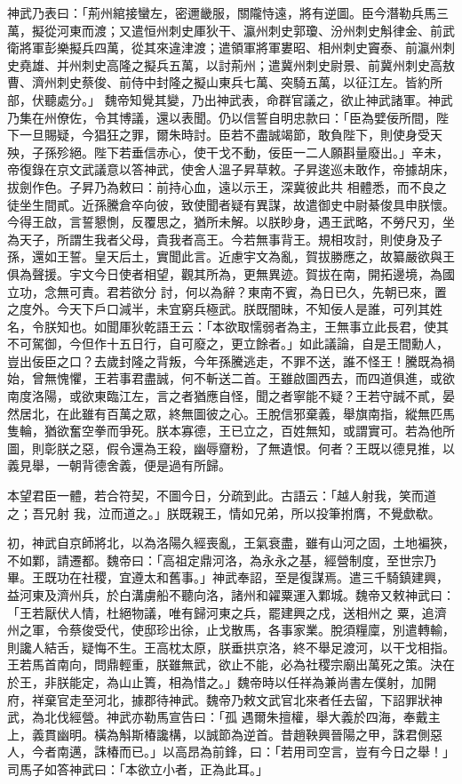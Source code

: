 \begin{pinyinscope}
 神武乃表曰：「荊州綰接蠻左，密邇畿服，關隴恃遠，將有逆圖。臣今潛勒兵馬三萬，擬從河東而渡；又遣恒州刺史厙狄干、瀛州刺史郭瓊、汾州刺史斛律金、前武衛將軍彭樂擬兵四萬，從其來違津渡；遣領軍將軍婁昭、相州刺史竇泰、前瀛州刺史堯雄、并州刺史高隆之擬兵五萬，以討荊州；遣冀州刺史尉景、前冀州刺史高敖曹、濟州刺史蔡俊、前侍中封隆之擬山東兵七萬、突騎五萬，以征江左。皆約所部，伏聽處分。」
 魏帝知覺其變，乃出神武表，命群官議之，欲止神武諸軍。神武乃集在州僚佐，令其博議，還以表聞。仍以信誓自明忠款曰：「臣為嬖佞所間，陛下一旦賜疑，今猖狂之罪，爾朱時討。臣若不盡誠竭節，敢負陛下，則使身受天殃，子孫殄絕。陛下若垂信赤心，使干戈不動，佞臣一二人願斟量廢出。」辛未，帝復錄在京文武議意以答神武，使舍人溫子昇草敕。子昇逡巡未敢作，帝據胡床，拔劍作色。子昇乃為敕曰：前持心血，遠以示王，深冀彼此共
 相體悉，而不良之徒坐生間貳。近孫騰倉卒向彼，致使聞者疑有異謀，故遣御史中尉綦俊具申朕懷。今得王啟，言誓懇惻，反覆思之，猶所未解。以朕眇身，遇王武略，不勞尺刃，坐為天子，所謂生我者父母，貴我者高王。今若無事背王。規相攻討，則使身及子孫，還如王誓。皇天后土，實聞此言。近慮宇文為亂，賀拔勝應之，故纂嚴欲與王俱為聲援。宇文今日使者相望，觀其所為，更無異迹。賀拔在南，開拓邊境，為國立功，念無可責。君若欲分
 討，何以為辭？東南不賓，為日已久，先朝已來，置之度外。今天下戶口減半，未宜窮兵極武。朕既闇昧，不知佞人是誰，可列其姓名，令朕知也。如聞厙狄乾語王云：「本欲取懦弱者為主，王無事立此長君，使其不可駕御，今但作十五日行，自可廢之，更立餘者。」如此議論，自是王間勳人，豈出佞臣之口？去歲封隆之背叛，今年孫騰逃走，不罪不送，誰不怪王！騰既為禍始，曾無愧懼，王若事君盡誠，何不斬送二首。王雖啟圖西去，而四道俱進，或欲
 南度洛陽，或欲東臨江左，言之者猶應自怪，聞之者寧能不疑？王若守誠不貳，晏然居北，在此雖有百萬之眾，終無圖彼之心。王脫信邪棄義，舉旗南指，縱無匹馬隻輪，猶欲奮空拳而爭死。朕本寡德，王已立之，百姓無知，或謂實可。若為他所圖，則彰朕之惡，假令還為王殺，幽辱齏粉，了無遺恨。何者？王既以德見推，以義見舉，一朝背德舍義，便是過有所歸。



 本望君臣一體，若合符契，不圖今日，分疏到此。古語云：「越人射我，笑而道之；吾兄射
 我，泣而道之。」朕既親王，情如兄弟，所以投筆拊膺，不覺歔欷。



 初，神武自京師將北，以為洛陽久經喪亂，王氣衰盡，雖有山河之固，土地褊狹，不如鄴，請遷都。魏帝曰：「高祖定鼎河洛，為永永之基，經營制度，至世宗乃畢。王既功在社稷，宜遵太和舊事。」神武奉詔，至是復謀焉。遣三千騎鎮建興，益河東及濟州兵，於白溝虜船不聽向洛，諸州和糴粟運入鄴城。魏帝又敕神武曰：「王若厭伏人情，杜絕物議，唯有歸河東之兵，罷建興之戍，送相州之
 粟，追濟州之軍，令蔡俊受代，使邸珍出徐，止戈散馬，各事家業。脫須糧廩，別遣轉輸，則讒人結舌，疑悔不生。王高枕太原，朕垂拱京洛，終不舉足渡河，以干戈相指。王若馬首南向，問鼎輕重，朕雖無武，欲止不能，必為社稷宗廟出萬死之策。決在於王，非朕能定，為山止簣，相為惜之。」魏帝時以任祥為兼尚書左僕射，加開府，祥棄官走至河北，據郡待神武。魏帝乃敕文武官北來者任去留，下詔罪狀神武，為北伐經營。神武亦勒馬宣告曰：「孤
 遇爾朱擅權，舉大義於四海，奉戴主上，義貫幽明。橫為斛斯椿讒構，以誠節為逆首。昔趙鞅興晉陽之甲，誅君側惡人，今者南邁，誅椿而已。」以高昂為前鋒，曰：「若用司空言，豈有今日之舉！」司馬子如答神武曰：「本欲立小者，正為此耳。」




\end{pinyinscope}
